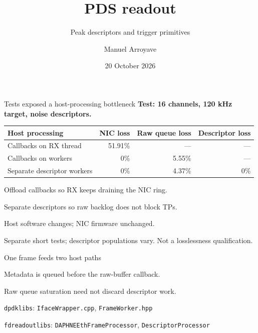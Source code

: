 \documentclass[aspectratio=169,11pt]{beamer}
\title{PDS readout}
\subtitle{Peak descriptors and trigger primitives}
\author{Manuel Arroyave}
\date{20 October 2026}
\begin{document}
\begin{frame}[plain]\titlepage\end{frame}

\begin{frame}{Tests exposed a host-processing bottleneck}
  \textbf{Test: 16 channels, 120 kHz target, noise descriptors.}\par
  \medskip
  \renewcommand{\arraystretch}{1.3}
  \begin{tabularx}{\textwidth}{@{}Xrrr@{}}
    \toprule
    Host processing & NIC loss & Raw queue loss & Descriptor loss \\
    \midrule
    Callbacks on RX thread & 51.91\% & --- & --- \\
    Callbacks on workers & 0\% & 5.55\% & --- \\
    Separate descriptor workers & 0\% & 4.37\% & 0\% \\
    \bottomrule
  \end{tabularx}
  \bigskip
  Offload callbacks so RX keeps draining the NIC ring.\par
  \smallskip
  Separate descriptors so raw backlog does not block TPs.\par
  \medskip
  {\small\color{DuneTextMuted}Host software changes; NIC firmware unchanged.\par
    Separate short tests; descriptor populations vary. Not a losslessness qualification.}
\end{frame}

\begin{frame}{One frame feeds two host paths}
  \centering
  \par
  \medskip
  Metadata is queued before the raw-buffer callback.\par
  Raw queue saturation need not discard descriptor work.\par
  \medskip
  \raggedright
  {\small
    \texttt{dpdklibs}: \texttt{IfaceWrapper.cpp}, \texttt{FrameWorker.hpp}\par
    \texttt{fdreadoutlibs}: \texttt{DAPHNEEthFrameProcessor}, \texttt{DescriptorProcessor}\par}
\end{frame}
\end{document}
